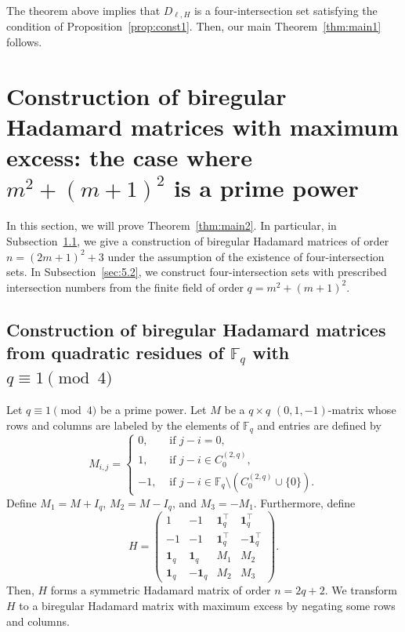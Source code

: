 \documentclass[10pt]{amsart}
\theoremstyle{definition}
\newcommand*\F{{\mathbb F}}
\newcommand*\tra{\top}
\newcommand*{\un}{\mathbf{1}}
\begin{document}
The theorem above implies that $D_{\ell,H}$ is a four-intersection set satisfying the condition of Proposition~\ref{prop:const1}. Then, our main Theorem~\ref{thm:main1} follows.


\section{Construction of biregular Hadamard matrices with maximum excess: the case where \texorpdfstring{$m^2+(m+1)^2$}{m2+(m+1)2} is a prime power}\label{sec:const2}

In this section, we will prove Theorem~\ref{thm:main2}. In particular, in Subsection~\ref{subsec:const2}, we give a construction of biregular Hadamard matrices of order $n=(2m+1)^2+3$ under the assumption of the existence of four-intersection sets. In Subsection~\ref{sec:5.2}, we construct four-intersection sets with prescribed intersection numbers from the finite field of order $q=m^2+(m+1)^2$.

\subsection{Construction of biregular Hadamard matrices from quadratic residues of \texorpdfstring{$\F_q$}{Fq} with \texorpdfstring{$q\equiv 1\pmod{4}$}{q = 1 (mod 4)}}\label{subsec:const2}

Let $q\equiv 1\pmod{4}$ be a prime power. Let $M$ be a $q\times q$ $(0,1,-1)$-matrix whose rows and columns are labeled by the elements of $\F_q$ and entries are defined by
\[
M_{i,j}=
\begin{cases}
0,& \text{ if } j-i=0,\\
1,& \text{ if } j-i\in C_0^{(2,q)},\\
-1,& \text{ if } j-i\in \F_q \setminus (C_0^{(2,q)} \cup \{0\}).
\end{cases}
\]
Define $M_1=M+I_q$, $M_2=M-I_q$, and $M_3=-M_1$. Furthermore, define
\begin{equation}\label{eq:hada2}
H=
\begin{pmatrix}
1 &-1 & \un_q^\tra& \un_q^\tra \\
-1 & -1 & \un_q^\tra&-\un_q^\tra \\
\un_q & \un_q &M_1 & M_2 \\
\un_q & -\un_q&M_2 & M_3
\end{pmatrix}.
\end{equation}
Then, $H$ forms a symmetric Hadamard matrix of order $n=2q+2$. We transform $H$ to a biregular Hadamard matrix with maximum excess by negating some rows and columns.
\end{document}
